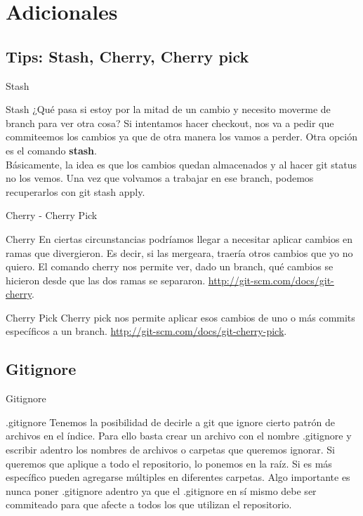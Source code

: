 \documentclass{beamer}
\begin{document}
\section{Adicionales}

\subsection{Tips: Stash, Cherry, Cherry pick}

\begin{frame}{Stash}
  \begin{block}{Stash}
  ¿Qué pasa si estoy por la mitad de un cambio y necesito moverme de branch para ver otra cosa? Si intentamos
  hacer checkout, nos va a pedir que commiteemos los cambios ya que de otra manera los vamos a perder. Otra opción
  es el comando \textbf{stash}. \footnotemark \\
  Básicamente, la idea es que los cambios quedan almacenados y al hacer git status no los vemos. Una vez que volvamos
  a trabajar en ese branch, podemos recuperarlos con git stash apply.
  \end{block}
  
\end{frame}

\begin{frame}{Cherry - Cherry Pick}
  \begin{block}{Cherry}
  En ciertas circunstancias podríamos llegar a necesitar aplicar cambios en ramas que divergieron. Es decir, si 
  las mergeara, traería otros cambios que yo no quiero. El comando cherry nos permite ver, dado un branch, qué cambios
  se hicieron desde que las dos ramas se separaron. \url{http://git-scm.com/docs/git-cherry}.
  \end{block}
  \pause
  \begin{block}{Cherry Pick}
  Cherry pick nos permite aplicar esos cambios de uno o más commits específicos a un branch. \url{http://git-scm.com/docs/git-cherry-pick}.
  \end{block}
\end{frame}

\subsection{Gitignore}

\begin{frame}{Gitignore}
  \begin{block}{.gitignore}
      Tenemos la posibilidad de decirle a git que ignore cierto patrón de archivos en el índice. Para ello basta crear un archivo con el nombre .gitignore
      y escribir adentro los nombres de archivos o carpetas que queremos ignorar. Si queremos que aplique a todo el repositorio, lo ponemos en la raíz.
      Si es más específico pueden agregarse múltiples en diferentes carpetas. Algo importante es nunca poner .gitignore adentro ya que el .gitignore en
      sí mismo debe ser commiteado para que afecte a todos los que utilizan el repositorio.
  \end{block}

\end{frame}
\end{document}
